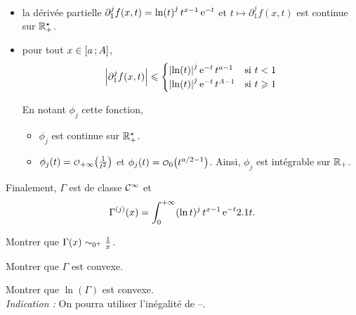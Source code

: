 \begin{demo}
\begin{itemize}
\item la dérivée partielle $\partial_1^j f(x, t) = \ln(t)^j \, t^{x - 1} \, \mathrm{e}^{-t}$ et $t \mapsto \partial_1^j f(x, t)$ est continue sur $\mathbb{R}^\star_+$.

\item pour tout $x \in \left[a\,;A\right]$,
\[
\abs{\partial_1^j f(x, t)} \leqslant
\begin{cases}
\abs{\ln(t)}^j \, \mathrm{e}^{-t} \, t^{a-1} &\text{si } t < 1 \\
\abs{\ln(t)}^j \, \mathrm{e}^{-t} \, t^{A-1} &\text{si } t \geqslant 1
\end{cases}
\]

En notant $\phi_j$ cette fonction,
\begin{itemize}
\item $\phi_j$ est continue sur $\mathbb{R}^\star_+$.
\item $\phi_j(t) = \petito_{+\infty}\mathopen{}\left(\frac{1}{t^2}\right)$ et $\phi_j(t) = \petito_0\mathopen{}\big(t^{a/2-1}\big)$. Ainsi, $\phi_j$ est intégrable sur $\mathbb{R}_+$.
\end{itemize}
\end{itemize}
Finalement, $\Gamma$ est de classe $\mathcal{C}^\infty$ et
\[
\Gamma^{(j)}(x) = \int_0^{+\infty} (\ln t)^j \, t^{x-1} \, \mathrm{e}^{-t} 2.1 t.
\]
\end{demo}


\begin{exercice}
\begin{questions}
\item Montrer que $\Gamma(x) \isEquivTo{0^+} \frac{1}{x}$.

\item Montrer que $\Gamma$ est convexe.

\item Montrer que $\ln(\Gamma)$ est convexe.\\
\emph{Indication :} On pourra utiliser l'inégalité de --.
\end{questions}
\end{exercice}

